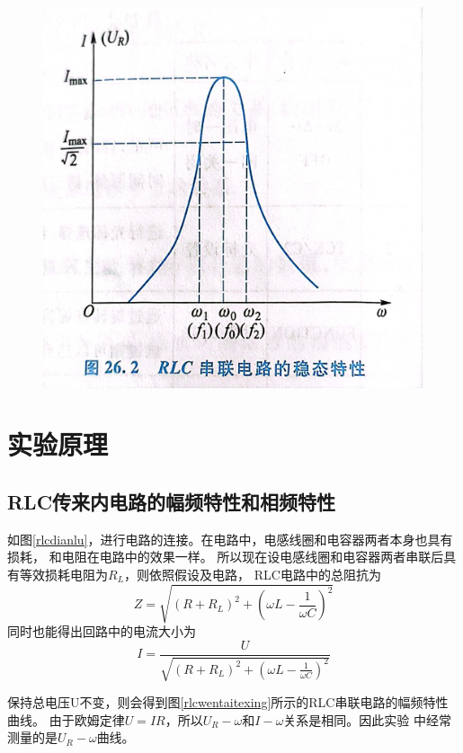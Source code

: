 \documentclass{ctexart}
\begin{document}
\begin{figure}[H]
\begin{minipage}[H]{0.4\textwidth}
  \includegraphics[width=\textwidth]{RLCwentaitexing.jpg}
  \end{minipage}
\end{figure}

\section{实验原理}
  \subsection{RLC传来内电路的幅频特性和相频特性}
  如图\ref{rlcdianlu}，进行电路的连接。在电路中，电感线圈和电容器两者本身也具有损耗，
  和电阻在电路中的效果一样。
  所以现在设电感线圈和电容器两者串联后具有等效损耗电阻为$R_{L}$，则依照假设及电路，
  RLC电路中的总阻抗为
  \begin{equation}\label{rlczongzukang}
    Z=\sqrt{(R+R_{L})^2+(\omega L-\frac{1}{\omega C})^2}
  \end{equation}
  同时也能得出回路中的电流大小为
  \begin{equation}\label{rlcdianliu}
    I=\frac{U}{\sqrt{(R+R_{L})^2+(\omega L-\frac{1}{\omega C})^2}}
  \end{equation}

  保持总电压U不变，则会得到图\ref{rlcwentaitexing}所示的RLC串联电路的幅频特性曲线。
  由于欧姆定律$U=IR$，所以$U_{R}-\omega \mbox{和} I-\omega$关系是相同。因此实验
  中经常测量的是$U_{R}-\omega$曲线。
\end{document}
